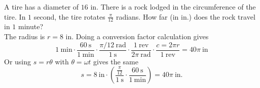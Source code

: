 A tire has a diameter of $16$ in. There is a rock lodged in the circumference of the tire. In $1$ second, the tire rotates $\frac{\pi}{12}$ radians. How far (in in.) does the rock travel in $1$ minute?
\[\]
The radius is $r = 8$ in. Doing a conversion factor calculation gives
$$
1\ \text{min} \cdot \frac{60\ \text{s}}{1\ \text{min}} \cdot \frac{\pi/12\ \text{rad}}{1\ \text{s}} \cdot \frac{1\ \text{rev}}{2\pi\ \text{rad}} \cdot \frac{c = 2\pi r}{1\ \text{rev}} = 40\pi\ \text{in}
$$
Or using $s = r\theta$ with $\theta = \omega t$ gives the same
$$
  s = 8\ \text{in} \cdot (\frac{\frac{\pi}{12}}{1\ \text{s}} \cdot \frac{60\ \text{s}}{1\ \text{min}}) = 40\pi\ \text{in}.
$$
